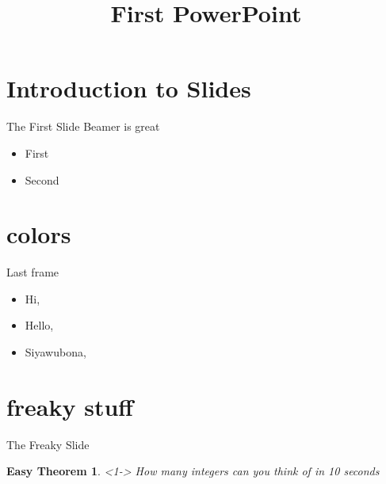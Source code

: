 \documentclass[11pt, pdf]{beamer}
\title{First PowerPoint}
\begin{document}
        \begin{frame}
            \titlepage
        \end{frame}

    \section{Introduction to Slides}
        \begin{frame}{The First Slide}
           Beamer is great
           \pause
           \begin{itemize}
               \item First
               \pause
               \item Second
           \end{itemize}
        \end{frame}
    \section{colors}
        \begin{frame}{Last frame}
           \begin{itemize}
               \item<2-4> Hi,
               \item<3-3> Hello,
               \item<4->  Siyawubona,
           \end{itemize}
        \end{frame}

    \section{freaky stuff}
        \begin{frame}{The Freaky Slide}
            \newtheorem{thm}{Easy Theorem}

            \begin{thm}<1->
                How many integers can you think of in 10 seconds
            \end{thm}
        \end{frame}
\end{document}
